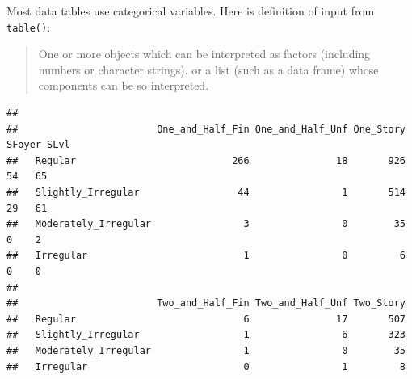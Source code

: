 \documentclass[
]{book}
\newenvironment{Shaded}{\begin{snugshade}}{\end{snugshade}}
\newcommand{\FunctionTok}[1]{\textcolor[rgb]{0.00,0.00,0.00}{#1}}
\newcommand{\NormalTok}[1]{#1}
\newcommand{\OtherTok}[1]{\textcolor[rgb]{0.56,0.35,0.01}{#1}}
\newcommand{\SpecialCharTok}[1]{\textcolor[rgb]{0.00,0.00,0.00}{#1}}
\begin{document}
Most data tables use categorical variables. Here is definition of input from \texttt{table()}:

\begin{quote}
One or more objects which can be interpreted as factors (including numbers or character strings), or a list (such as a data frame) whose components can be so interpreted.
\end{quote}

\begin{Shaded}
\end{Shaded}

\begin{verbatim}
##                       
##                        One_and_Half_Fin One_and_Half_Unf One_Story SFoyer SLvl
##   Regular                           266               18       926     54   65
##   Slightly_Irregular                 44                1       514     29   61
##   Moderately_Irregular                3                0        35      0    2
##   Irregular                           1                0         6      0    0
##                       
##                        Two_and_Half_Fin Two_and_Half_Unf Two_Story
##   Regular                             6               17       507
##   Slightly_Irregular                  1                6       323
##   Moderately_Irregular                1                0        35
##   Irregular                           0                1         8
\end{verbatim}

\begin{Shaded}
\end{Shaded}
\end{document}
